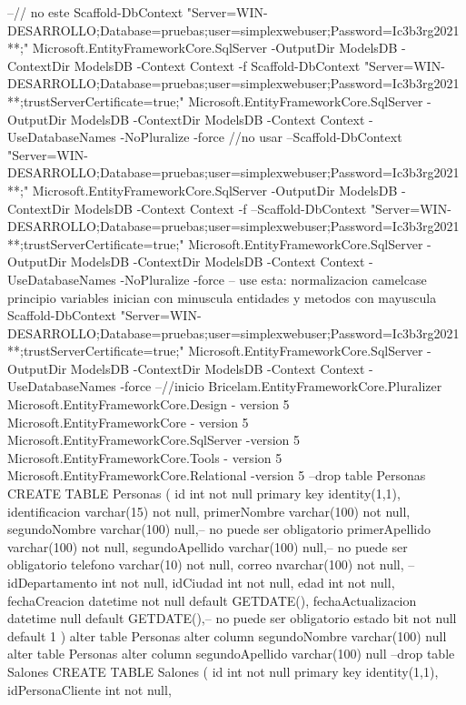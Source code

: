 --// no este
Scaffold-DbContext "Server=WIN-DESARROLLO\DEVSQLSERVER;Database=pruebas;user=simplexwebuser;Password=Ic3b3rg2021**;" Microsoft.EntityFrameworkCore.SqlServer -OutputDir ModelsDB -ContextDir ModelsDB -Context Context -f
Scaffold-DbContext "Server=WIN-DESARROLLO\DEVSQLSERVER;Database=pruebas;user=simplexwebuser;Password=Ic3b3rg2021**;trustServerCertificate=true;" Microsoft.EntityFrameworkCore.SqlServer -OutputDir ModelsDB -ContextDir ModelsDB -Context Context -UseDatabaseNames -NoPluralize -force
//no usar
--Scaffold-DbContext "Server=WIN-DESARROLLO\DEVSQLSERVER;Database=pruebas;user=simplexwebuser;Password=Ic3b3rg2021**;" Microsoft.EntityFrameworkCore.SqlServer -OutputDir ModelsDB -ContextDir ModelsDB -Context Context -f
--Scaffold-DbContext "Server=WIN-DESARROLLO\DEVSQLSERVER;Database=pruebas;user=simplexwebuser;Password=Ic3b3rg2021**;trustServerCertificate=true;" Microsoft.EntityFrameworkCore.SqlServer -OutputDir ModelsDB -ContextDir ModelsDB -Context Context -UseDatabaseNames -NoPluralize -force
 -- use esta: normalizacion camelcase principio variables inician con minuscula entidades y metodos con mayuscula
 Scaffold-DbContext "Server=WIN-DESARROLLO\DEVSQLSERVER;Database=pruebas;user=simplexwebuser;Password=Ic3b3rg2021**;trustServerCertificate=true;" Microsoft.EntityFrameworkCore.SqlServer -OutputDir ModelsDB -ContextDir ModelsDB -Context Context -UseDatabaseNames  -force
--//inicio
Bricelam.EntityFrameworkCore.Pluralizer
Microsoft.EntityFrameworkCore.Design - version 5
Microsoft.EntityFrameworkCore - version 5
Microsoft.EntityFrameworkCore.SqlServer -version 5
Microsoft.EntityFrameworkCore.Tools - version 5
Microsoft.EntityFrameworkCore.Relational -version 5
--drop table Personas
CREATE TABLE Personas
(
	id int not null primary key identity(1,1),
	identificacion varchar(15) not null,
	primerNombre varchar(100) not null,
    segundoNombre  varchar(100)  null,-- no puede ser obligatorio
    primerApellido varchar(100) not null,
    segundoApellido varchar(100) null,-- no puede ser obligatorio
    telefono varchar(10) not null,
    correo nvarchar(100) not null,
    --idDepartamento int not null,
    idCiudad int not null,
    edad int not null,
    fechaCreacion datetime not null default GETDATE(),
	fechaActualizacion datetime null default GETDATE(),-- no puede ser obligatorio
    estado bit not null default 1
)
alter table Personas alter column segundoNombre  varchar(100)  null
alter table Personas alter column segundoApellido  varchar(100)  null
--drop table Salones
CREATE TABLE Salones
(
  id int not null primary key identity(1,1),
  idPersonaCliente int not null,
